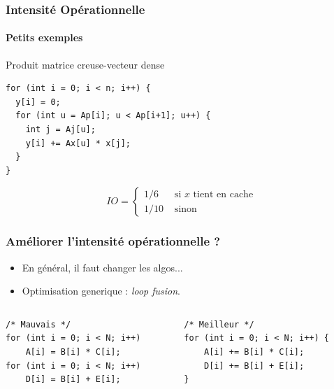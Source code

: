 \documentclass[xcolor={x11names,svgnames}, 14pt]{beamer}
\begin{document}

\begin{frame}[fragile]
  \frametitle{Intensité Opérationnelle}
  \framesubtitle{Petits exemples}
  
  \begin{block}{Produit matrice creuse-vecteur dense}
\begin{verbatim}
for (int i = 0; i < n; i++) {
  y[i] = 0;
  for (int u = Ap[i]; u < Ap[i+1]; u++) {
    int j = Aj[u];
    y[i] += Ax[u] * x[j];
  }
}
\end{verbatim}
  \end{block}

  \pause

  \[
    IO = \begin{cases}
      1 / 6  & \text{ si $x$ tient en cache} \\
      1 / 10 & \text{ sinon}
    \end{cases}
  \]  
\end{frame}


\begin{frame}[fragile]
  \frametitle{Améliorer l'intensité opérationnelle ?}

  \begin{itemize}
  \item En général, il faut changer les algos...
  \item Optimisation generique : \emph{loop fusion}.
  \end{itemize}

  \bigskip
  
  \begin{columns}
    \begin{column}{0.5\textwidth}
\begin{verbatim}
/* Mauvais */
for (int i = 0; i < N; i++)
    A[i] = B[i] * C[i];
for (int i = 0; i < N; i++)
    D[i] = B[i] + E[i];
\end{verbatim}
    \end{column}
    \begin{column}{0.5\textwidth}
\begin{verbatim}
/* Meilleur */
for (int i = 0; i < N; i++) {
    A[i] += B[i] * C[i];
    D[i] += B[i] + E[i];
}
\end{verbatim}
    \end{column}
  \end{columns}
\end{frame}
\end{document}
